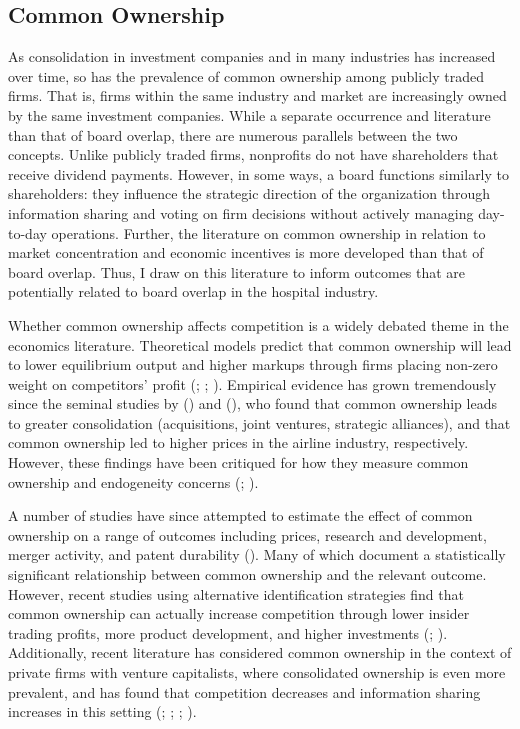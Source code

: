 \documentclass[12pt]{article}
\begin{document}
    \subsection{Common Ownership}\label{sec:commonownerlit}

    As consolidation in investment companies and in many industries has increased over time, so has the prevalence of common ownership among publicly traded firms. That is, firms within the same industry and market are increasingly owned by the same investment companies. While a separate occurrence and literature than that of board overlap, there are numerous parallels between the two concepts. Unlike publicly traded firms, nonprofits do not have shareholders that receive dividend payments. However, in some ways, a board functions similarly to shareholders: they influence the strategic direction of the organization through information sharing and voting on firm decisions without actively managing day-to-day operations. Further, the literature on common ownership in relation to market concentration and economic incentives is more developed than that of board overlap. Thus, I draw on this literature to inform outcomes that are potentially related to board overlap in the hospital industry. 
    
    Whether common ownership affects competition is a widely debated theme in the economics literature. Theoretical models predict that common ownership will lead to lower equilibrium output and higher markups through firms placing non-zero weight on competitors' profit (\cite{rubinstein1983competitive}; \cite{rotemberg1984financial}; \cite{azar2012new}). Empirical evidence has grown tremendously since the seminal studies by \citeauthor{he2017product} (\citeyear{he2017product}) and \citeauthor{azar2018anticompetitive} (\citeyear{azar2018anticompetitive}), who found that common ownership leads to greater consolidation (acquisitions, joint ventures, strategic alliances), and that common ownership led to higher prices in the airline industry, respectively. However, these findings have been critiqued for how they measure common ownership and endogeneity concerns (\cite{kennedy2017competitive}; \cite{lewellen2021does}).

    A number of studies have since attempted to estimate the effect of common ownership on a range of outcomes including prices, research and development, merger activity, and patent durability (\cite{gerardi2023critical}). Many of which document a statistically significant relationship between common ownership and the relevant outcome. However, recent studies using alternative identification strategies find that common ownership can actually increase competition through lower insider trading profits, more product development, and higher investments (\cite{chen2023does}; \cite{kini2024common}). Additionally, recent literature has considered common ownership in the context of private firms with venture capitalists, where consolidated ownership is even more prevalent, and has found that competition decreases and information sharing increases in this setting (\cite{lindsey2008blurring}; \cite{gonzalez2020exchanges}; \cite{li2023common}; \cite{eldar2024common}).
\end{document}
